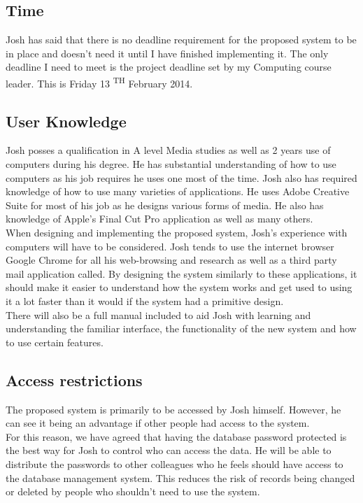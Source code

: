 \subsection{Time}

Josh has said that there is no deadline requirement for the proposed system to be in place and doesn't need it until I have finished implementing it. The only deadline I need to meet is the project deadline set by my Computing course leader. This is Friday 13 \textsuperscript{TH} February 2014.

\subsection{User Knowledge}

Josh posses a qualification in A level Media studies as well as 2 years use of computers during his degree. He has substantial understanding of how to use computers as his job requires he uses one most of the time. Josh also has required knowledge of how to use many varieties of applications. He uses Adobe Creative Suite for most of his job as he designs various forms of media. He also has knowledge of Apple's Final Cut Pro application as well as many others.\\

\noindent When designing and implementing the proposed system, Josh's experience with computers will have to be considered. Josh tends to use the internet browser Google Chrome for all his web-browsing and research as well as a third party mail application called. By designing the system similarly to these applications, it should make it easier to understand how the system works and get used to using it a lot faster than it would if the system had a primitive design.\\

\noindent There will also be a full manual included to aid Josh with learning and understanding the familiar interface, the functionality of the new system and how to use certain features.

\subsection{Access restrictions}

The proposed system is primarily to be accessed by Josh himself. However, he can see it being an advantage if other people had access to the system.\\

\noindent For this reason, we have agreed that having the database password protected is the best way for Josh to control who can access the data. He will be able to distribute the passwords to other colleagues who he feels should have access to the database management system. This reduces the risk of records being changed or deleted by people who shouldn't need to use the system.

